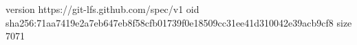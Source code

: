 version https://git-lfs.github.com/spec/v1
oid sha256:71aa7419e2a7eb647eb8f58cfb01739f0e18509cc31ee41d310042e39acb9cf8
size 7071

